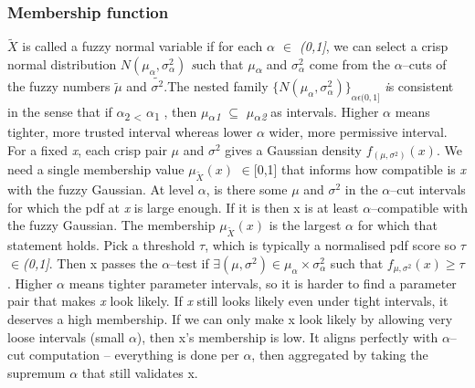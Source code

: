 \documentclass[12pt,a4paper]{report}
\numberwithin{equation}{section}
\begin{document}
\hypertarget{membership--function}{%
\subsubsection{Membership function}\label{membership--function}}

\(\widetilde{X}\) is called a fuzzy normal variable if for each \emph{$\alpha$
$\in$ (0,1{]}}, we can select a crisp normal distribution
\(N\left( \mu_{\alpha},\sigma_{\alpha}^{2} \right)\) \emph{s}uch that
\emph{$\mu$\textsubscript{$\alpha$}} and \(\sigma_{\alpha}^{2}\) come from the
$\alpha$--cuts of the fuzzy numbers \(\widetilde{\mu}\) and
\(\widetilde{\sigma^{2}}.\)The nested family
\(\{ N{\left( \mu_{\alpha},\sigma_{\alpha}^{2} \right)\}}_{\alpha\epsilon(0,1\rbrack}\)
\emph{i}s consistent in the sense that if $\alpha$\textsubscript{2 \textless{}}
$\alpha$\textsubscript{1} \hspace{0pt}, then
\emph{$\mu$\textsubscript{$\alpha$1}}\hspace{0pt} \emph{$\subseteq$} \emph{$\mu$\textsubscript{$\alpha$2
}}as intervals. Higher \emph{$\alpha$} means tighter, more trusted interval
whereas lower \emph{$\alpha$} wider, more permissive interval. For a fixed
\emph{x}, each crisp pair \emph{$\mu$} and \(\sigma^{2}\) gives a Gaussian
density \(f_{(\mu,\sigma^{2})}(x).\) We need a single membership value
\(\mu_{\widetilde{X}}(x)\) $\in${[}0,1{]} that informs how compatible is
\emph{x} with the fuzzy Gaussian. At level $\alpha$, is there some \emph{$\mu$} and
\(\sigma^{2}\) in the $\alpha$--cut intervals for which the pdf at \emph{x} is
large enough. If it is then x is at least $\alpha$--compatible with the fuzzy
Gaussian. The membership \(\mu_{\widetilde{X}}(x)\) is the largest $\alpha$ for
which that statement holds. Pick a threshold \emph{$\tau$}, which is
typically a normalised pdf score so \emph{$\tau$$\in$(0,1{]}}. Then x passes the
$\alpha$--test if
\(\exists\left( \mu,\sigma^{2} \right) \in \mu_{\alpha} \times \sigma_{\alpha}^{2}\)
such that \(f_{\mu,\sigma^{2}}(x) \geq \tau\). Higher \emph{$\alpha$} means
tighter parameter intervals, so it is harder to find a parameter pair
that makes \emph{x} look likely. If \emph{x} still looks likely even
under tight intervals, it deserves a high membership. If we can only
make x look likely by allowing very loose intervals (small $\alpha$), then x's
membership is low. It aligns perfectly with $\alpha$--cut computation --
everything is done per $\alpha$, then aggregated by taking the supremum $\alpha$ that
still validates x.
\end{document}
